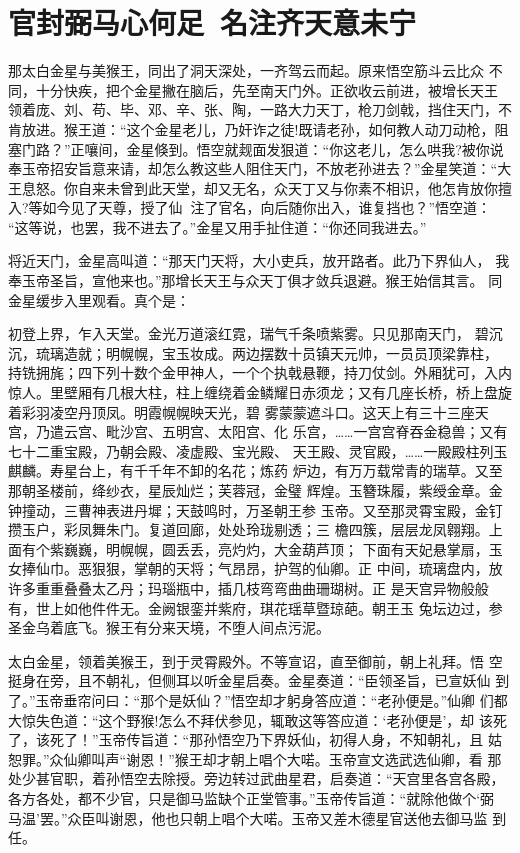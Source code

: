 \chapter{官封弼马心何足~名注齐天意未宁}

那太白金星与美猴王，同出了洞天深处，一齐驾云而起。原来悟空筋斗云比众
不同，十分快疾，把个金星撇在脑后，先至南天门外。正欲收云前进，被增长天王
领着庞、刘、苟、毕、邓、辛、张、陶，一路大力天丁，枪刀剑戟，挡住天门，不
肯放进。猴王道：“这个金星老儿，乃奸诈之徒!既请老孙，如何教人动刀动枪，阻
塞门路？”正嚷间，金星倏到。悟空就觌面发狠道：“你这老儿，怎么哄我?被你说
奉玉帝招安旨意来请，却怎么教这些人阻住天门，不放老孙进去？”金星笑道：“大
王息怒。你自来未曾到此天堂，却又无名，众天丁又与你素不相识，他怎肯放你擅
入?等如今见了天尊，授了仙，注了官名，向后随你出入，谁复挡也？”悟空道：
“这等说，也罢，我不进去了。”金星又用手扯住道：“你还同我进去。”

将近天门，金星高叫道：“那天门天将，大小吏兵，放开路者。此乃下界仙人，
我奉玉帝圣旨，宣他来也。”那增长天王与众天丁俱才敛兵退避。猴王始信其言。
同金星缓步入里观看。真个是：

初登上界，乍入天堂。金光万道滚红霓，瑞气千条喷紫雾。只见那南天门，
碧沉沉，琉璃造就；明幌幌，宝玉妆成。两边摆数十员镇天元帅，一员员顶梁靠柱，
持铣拥旄；四下列十数个金甲神人，一个个执戟悬鞭，持刀仗剑。外厢犹可，入内
惊人。里壁厢有几根大柱，柱上缠绕着金鳞耀日赤须龙；又有几座长桥，桥上盘旋
着彩羽凌空丹顶凤。明霞幌幌映天光，碧
雾蒙蒙遮斗口。这天上有三十三座天宫，乃遣云宫、毗沙宫、五明宫、太阳宫、化
乐宫，……一宫宫脊吞金稳兽；又有七十二重宝殿，乃朝会殿、凌虚殿、宝光殿、
天王殿、灵官殿，……一殿殿柱列玉麒麟。寿星台上，有千千年不卸的名花；炼药
炉边，有万万载常青的瑞草。又至那朝圣楼前，绛纱衣，星辰灿烂；芙蓉冠，金璧
辉煌。玉簪珠履，紫绶金章。金钟撞动，三曹神表进丹墀；天鼓鸣时，万圣朝王参
玉帝。又至那灵霄宝殿，金钉攒玉户，彩凤舞朱门。复道回廊，处处玲珑剔透；三
檐四簇，层层龙凤翱翔。上面有个紫巍巍，明幌幌，圆丢丢，亮灼灼，大金葫芦顶；
下面有天妃悬掌扇，玉女捧仙巾。恶狠狠，掌朝的天将；气昂昂，护驾的仙卿。正
中间，琉璃盘内，放许多重重叠叠太乙丹；玛瑙瓶中，插几枝弯弯曲曲珊瑚树。正
是天宫异物般般有，世上如他件件无。金阙银銮并紫府，琪花瑶草暨琼葩。朝王玉
兔坛边过，参圣金乌着底飞。猴王有分来天境，不堕人间点污泥。

太白金星，领着美猴王，到于灵霄殿外。不等宣诏，直至御前，朝上礼拜。悟
空挺身在旁，且不朝礼，但侧耳以听金星启奏。金星奏道：“臣领圣旨，已宣妖仙
到了。”玉帝垂帘问曰：“那个是妖仙？”悟空却才躬身答应道：“老孙便是。”仙卿
们都大惊失色道：“这个野猴!怎么不拜伏参见，辄敢这等答应道：‘老孙便是’，却
该死了，该死了！”玉帝传旨道：“那孙悟空乃下界妖仙，初得人身，不知朝礼，且
姑恕罪。”众仙卿叫声“谢恩！”猴王却才朝上唱个大喏。玉帝宣文选武选仙卿，看
那处少甚官职，着孙悟空去除授。旁边转过武曲星君，启奏道：“天宫里各宫各殿，
各方各处，都不少官，只是御马监缺个正堂管事。”玉帝传旨道：“就除他做个‘弼
马温’罢。”众臣叫谢恩，他也只朝上唱个大喏。玉帝又差木德星官送他去御马监
到任。

